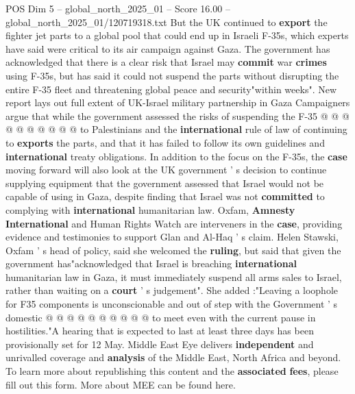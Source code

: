 \begin{textsample}{POS Dim 5 – global\_north\_2025\_01 – Score 16.00 – global\_north\_2025\_01/120719318.txt}
But the UK continued to \textbf{export} the fighter jet parts to a global pool that could end up in Israeli F-35s, which experts have said were critical to its air campaign against Gaza.
The government has acknowledged that there is a clear risk that Israel may \textbf{commit} war \textbf{crimes} using F-35s, but has said it could not suspend the parts without disrupting the entire F-35 fleet and threatening global peace and security"within weeks".
New report lays out full extent of UK-Israel military partnership in Gaza Campaigners argue that while the government assessed the risks of suspending the F-35 @ @ @ @ @ @ @ @ @ @ to Palestinians and the \textbf{international} rule of law of continuing to \textbf{exports} the parts, and that it has failed to follow its own guidelines and \textbf{international} treaty obligations.
In addition to the focus on the F-35s, the \textbf{case} moving forward will also look at the UK government ' s decision to continue supplying equipment that the government assessed that Israel would not be capable of using in Gaza, despite finding that Israel was not \textbf{committed} to complying with \textbf{international} humanitarian law.
Oxfam, \textbf{Amnesty} \textbf{International} and Human Rights Watch are interveners in the \textbf{case}, providing evidence and testimonies to support Glan and Al-Haq ' s claim.
Helen Stawski, Oxfam ' s head of policy, said she welcomed the \textbf{ruling}, but said that given the government has"acknowledged that Israel is breaching \textbf{international} humanitarian law in Gaza, it must immediately suspend all arms sales to Israel, rather than waiting on a \textbf{court} ' s judgement".
She added :"Leaving a loophole for F35 components is unconscionable and out of step with the Government ' s domestic @ @ @ @ @ @ @ @ @ @ to meet even with the current pause in hostilities."A hearing that is expected to last at least three days has been provisionally set for 12 May.
Middle East Eye delivers \textbf{independent} and unrivalled coverage and \textbf{analysis} of the Middle East, North Africa and beyond.
To learn more about republishing this content and the \textbf{associated} \textbf{fees}, please fill out this form.
More about MEE can be found here.

\end{textsample}
